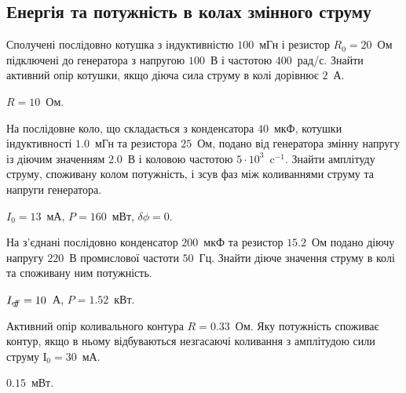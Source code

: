\subsection*{Енергія та потужність в колах змінного струму}

\begin{problem}%
    Сполучені послідовно котушка з індуктивністю $100$~мГн і резистор
    $R_0 = 20$~Ом підключені до генератора з напругою $100$~В і частотою $400$~рад/с. Знайти активний опір котушки, якщо діюча сила струму в колі дорівнює $2$~А.
\begin{solution}
    $R = 10$~Ом.
\end{solution}
\end{problem}


\begin{problem}%
    На послідовне коло, що складається з конденсатора $40$~мкФ, котушки
    індуктивності $1.0$~мГн та резистора $25$~Ом, подано від генератора змінну напругу із діючим значенням $2.0$~В і коловою частотою $5\cdot 10^3$~c${}^{-1}$. Знайти амплітуду струму, споживану колом потужність, і зсув фаз між коливаннями струму та     напруги генератора.
\begin{solution}
    $I_0 = 13$~мА, $P = 160$~мВт, $\delta\phi = 0$.
\end{solution}
\end{problem}

\begin{problem}%
    На з'єднані послідовно конденсатор $200$~мкФ та резистор $15.2$~Ом подано діючу напругу $220$~В промислової частоти $50$~Гц. Знайти діюче значення
    струму в колі та споживану ним потужність.
\begin{solution}
    $I_{e\kern-2.2pt f\kern-3pt f} = 10$~А, $P = 1.52$~кВт.
\end{solution}
\end{problem}



\begin{problem}%
    Активний опір коливального контура $R = 0.33$~Ом. Яку потужність
    споживає контур, якщо в ньому відбуваються незгасаючі коливання з амплітудою сили струму $І_0 = 30$~мА.
\begin{solution}
    $0.15$~мВт.
\end{solution}
\end{problem}


